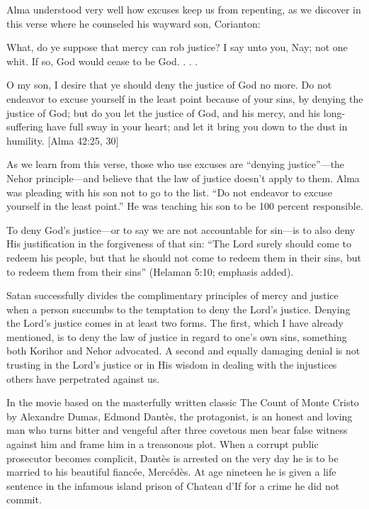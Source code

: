 \documentclass[letterpaper, 11pt]{report}
\newcommand{\intalkheader}[1]{
    \vspace{0.75em}
    \noindent{\normalsize\bfseries #1}
    \par\nopagebreak %
    \vspace{0.25em}
    \nopagebreak     %
}
\begin{document}
Alma understood very well how excuses keep us from repenting, as we discover in this verse where he counseled his wayward son, Corianton:

What, do ye suppose that mercy can rob justice? I say unto you, Nay; not one whit. If so, God would cease to be God. . . .

O my son, I desire that ye should deny the justice of God no more. Do not endeavor to excuse yourself in the least point because of your sins, by denying the justice of God; but do you let the justice of God, and his mercy, and his long-suffering have full sway in your heart; and let it bring you down to the dust in humility. [Alma 42:25, 30]

As we learn from this verse, those who use excuses are “denying justice”—the Nehor ­principle—and believe that the law of justice doesn’t apply to them. Alma was pleading with his son not to go to the list. “Do not endeavor to excuse yourself in the least point.” He was teaching his son to be 100 percent responsible.

To deny God’s justice—or to say we are not accountable for sin—is to also deny His justification in the forgiveness of that sin: “The Lord surely should come to redeem his people, but that he should not come to redeem them in their sins, but to redeem them from their sins” (Helaman 5:10; emphasis added).

\intalkheader{Two Ways to Deny the Lord’s Justice}
Satan successfully divides the complimentary principles of mercy and justice when a person succumbs to the temptation to deny the Lord’s justice. Denying the Lord’s justice comes in at least two forms. The first, which I have already mentioned, is to deny the law of justice in regard to one’s own sins, something both Korihor and Nehor advocated. A second and equally damaging denial is not trusting in the Lord’s justice or in His wisdom in dealing with the injustices others have perpetrated against us.

In the movie based on the masterfully written classic The Count of Monte Cristo by Alexandre Dumas, Edmond Dantès, the protagonist, is an honest and loving man who turns bitter and vengeful after three covetous men bear false witness against him and frame him in a treasonous plot. When a corrupt public prosecutor becomes complicit, Dantès is arrested on the very day he is to be married to his beautiful fiancée, Mercédès. At age nineteen he is given a life sentence in the infamous island prison of Chateau d’If for a crime he did not commit.
\end{document}
